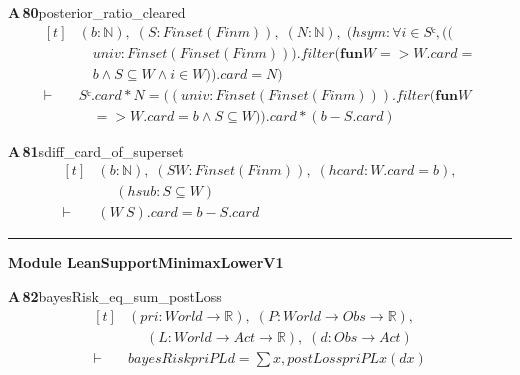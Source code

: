 \documentclass[conference]{IEEEtran}
\theoremstyle{definition}
\newcommand{\lean}[1]{\textsf{\footnotesize #1}}
\begin{document}
\noindent\textbf{A\,80}\quad\lean{posterior\_ratio\_cleared}
{\footnotesize\[ \begin{aligned}[t]
&(\mathit{b} : \mathbb{N} ),\; (\mathit{S} : \mathit{Finset} (\mathit{Fin} \mathit{m})),\; (\mathit{N} : \mathbb{N} ),\; (\mathit{hsym} : \forall \mathit{i} \in \mathit{Sᶜ}, ((\\
&\quad \mathit{univ} : \mathit{Finset} (\mathit{Finset} (\mathit{Fin} \mathit{m}))).\mathit{filter} (\mathbf{fun} \mathit{W} => \mathit{W}.\mathit{card} =\\
&\quad \mathit{b} \wedge \mathit{S} \subseteq \mathit{W} \wedge \mathit{i} \in \mathit{W})).\mathit{card} = \mathit{N})\\
\vdash\;&\mathit{Sᶜ}.\mathit{card} * \mathit{N} = ((\mathit{univ} : \mathit{Finset} (\mathit{Finset} (\mathit{Fin} \mathit{m}))).\mathit{filter} (\mathbf{fun} \mathit{W}\\
&\quad => \mathit{W}.\mathit{card} = \mathit{b} \wedge \mathit{S} \subseteq \mathit{W})).\mathit{card} * (\mathit{b} - \mathit{S}.\mathit{card})
\end{aligned} \]}

\noindent\textbf{A\,81}\quad\lean{sdiff\_card\_of\_superset}
{\footnotesize\[ \begin{aligned}[t]
&(\mathit{b} : \mathbb{N} ),\; (\mathit{S} \mathit{W} : \mathit{Finset} (\mathit{Fin} \mathit{m})),\; (\mathit{hcard} : \mathit{W}.\mathit{card} = \mathit{b}),\\
&\quad \; (\mathit{hsub} : \mathit{S} \subseteq \mathit{W})\\
\vdash\;&(\mathit{W} \ \mathit{S}).\mathit{card} = \mathit{b} - \mathit{S}.\mathit{card}
\end{aligned} \]}

\vspace{4pt}\noindent\rule{\columnwidth}{0.4pt}\par\vspace{2pt}
\noindent\textbf{Module \lean{LeanSupportMinimaxLowerV1}}\par\vspace{3pt}

\noindent\textbf{A\,82}\quad\lean{bayesRisk\_eq\_sum\_postLoss}
{\footnotesize\[ \begin{aligned}[t]
&(\mathit{pri} : \mathit{World} \to \mathbb{R} ),\; (\mathit{P} : \mathit{World} \to \mathit{Obs} \to \mathbb{R} ),\\
&\quad \; (\mathit{L} : \mathit{World} \to \mathit{Act} \to \mathbb{R} ),\; (\mathit{d} : \mathit{Obs} \to \mathit{Act})\\
\vdash\;&\mathit{bayesRisk} \mathit{pri} \mathit{P} \mathit{L} \mathit{d} = \textstyle\sum \mathit{x}, \mathit{postLoss} \mathit{pri} \mathit{P} \mathit{L} \mathit{x} (\mathit{d} \mathit{x})
\end{aligned} \]}
\end{document}
